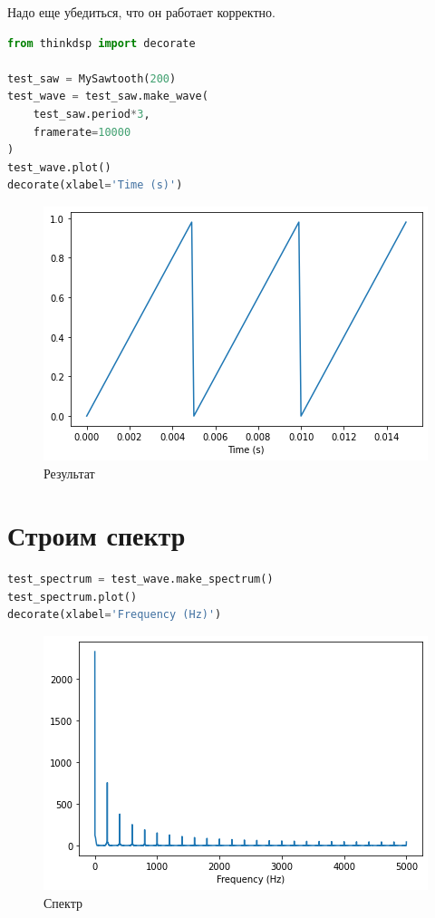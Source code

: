 \documentclass[a4paper,12pt]{report}
\begin{document}
    Надо еще убедиться, что он работает корректно.
    
\begin{lstlisting}[language=Python,caption=Проверка]
from thinkdsp import decorate

test_saw = MySawtooth(200)
test_wave = test_saw.make_wave(
    test_saw.period*3, 
    framerate=10000
)
test_wave.plot()
decorate(xlabel='Time (s)')
\end{lstlisting}

    \begin{figure}[H]
        \centering
        \includegraphics[width=\textwidth]{ex2_sawtooth_test.png}
        \caption{Результат}
        \label{fig:ex2_sawtooth_test}
    \end{figure}
    
    \section{Строим спектр}
    
\begin{lstlisting}[language=Python,caption=Построение спектра]
test_spectrum = test_wave.make_spectrum()
test_spectrum.plot()
decorate(xlabel='Frequency (Hz)')
\end{lstlisting}

    \begin{figure}[H]
        \centering
        \includegraphics[width=\textwidth]{ex2_spectrum.png}
        \caption{Спектр}
        \label{fig:ex2_spectrum}
    \end{figure}
    
\end{document}
